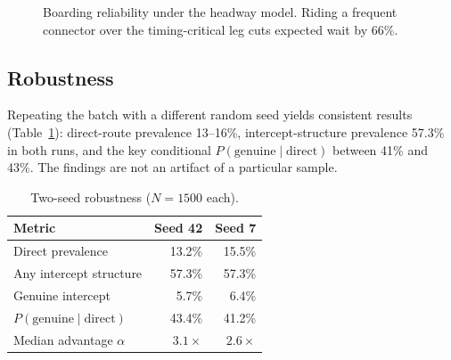 \documentclass[conference]{IEEEtran}
\begin{document}
\begin{figure}[t]
\centering
{}
\caption{Boarding reliability under the headway model. Riding a frequent
connector over the timing-critical leg cuts expected wait by 66\%.}
\label{fig:wait}
\end{figure}

\subsection{Robustness}
Repeating the batch with a different random seed yields consistent results
(Table~\ref{tab:robust}): direct-route prevalence 13--16\%, intercept-structure
prevalence 57.3\% in both runs, and the key conditional
$P(\text{genuine}\mid\text{direct})$ between 41\% and 43\%. The findings are not
an artifact of a particular sample.

\begin{table}[t]
\caption{Two-seed robustness ($N{=}1500$ each).}
\label{tab:robust}
\centering
\begin{tabular}{lrr}
\toprule
\textbf{Metric} & \textbf{Seed 42} & \textbf{Seed 7} \\
\midrule
Direct prevalence              & 13.2\% & 15.5\% \\
Any intercept structure        & 57.3\% & 57.3\% \\
Genuine intercept              & 5.7\%  & 6.4\% \\
$P(\text{genuine}\mid\text{direct})$ & 43.4\% & 41.2\% \\
Median advantage $\alpha$      & $3.1\times$ & $2.6\times$ \\
\bottomrule
\end{tabular}
\end{table}
\end{document}
